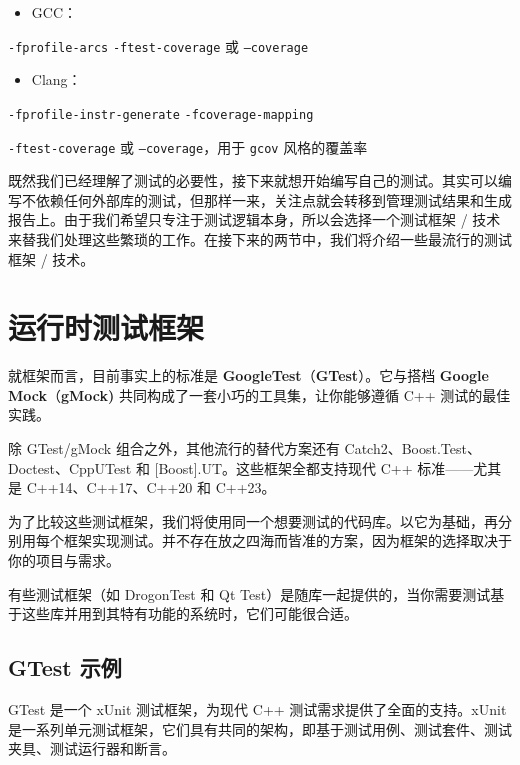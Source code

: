 \begin{itemize}
\item GCC：
\end{itemize}

\texttt{-fprofile-arcs} \texttt{-ftest-coverage} 或 \texttt{–coverage}

\begin{itemize}
\item Clang：
\end{itemize}

\texttt{-fprofile-instr-generate} \texttt{-fcoverage-mapping}

\texttt{-ftest-coverage} 或 \texttt{–coverage}，用于 \texttt{gcov} 风格的覆盖率

既然我们已经理解了测试的必要性，接下来就想开始编写自己的测试。其实可以编写不依赖任何外部库的测试，但那样一来，关注点就会转移到管理测试结果和生成报告上。由于我们希望只专注于测试逻辑本身，所以会选择一个测试框架 / 技术来替我们处理这些繁琐的工作。在接下来的两节中，我们将介绍一些最流行的测试框架 / 技术。

\section{运行时测试框架}

\label{idx:810}
\label{idx:811}
\label{idx:812}
就框架而言，目前事实上的标准是 \textbf{GoogleTest}（\textbf{GTest}）。它与搭档 \textbf{Google Mock}（\textbf{gMock)} 共同构成了一套小巧的工具集，让你能够遵循 C++ 测试的最佳实践。

除 GTest/gMock 组合之外，其他流行的替代方案还有 Catch2、Boost.Test、Doctest、CppUTest 和 [Boost].UT。这些框架全都支持现代 C++ 标准——尤其是 C++14、C++17、C++20 和 C++23。

为了比较这些测试框架，我们将使用同一个想要测试的代码库。以它为基础，再分别用每个框架实现测试。并不存在放之四海而皆准的方案，因为框架的选择取决于你的项目与需求。

\label{idx:813}
有些测试框架（如 DrogonTest 和 Qt Test）是随库一起提供的，当你需要测试基于这些库并用到其特有功能的系统时，它们可能很合适。

\subsection{GTest 示例}

\label{idx:814}
\label{idx:815}
GTest 是一个 xUnit 测试框架，为现代 C++ 测试需求提供了全面的支持。xUnit 是一系列单元测试框架，它们具有共同的架构，即基于测试用例、测试套件、测试夹具、测试运行器和断言。

